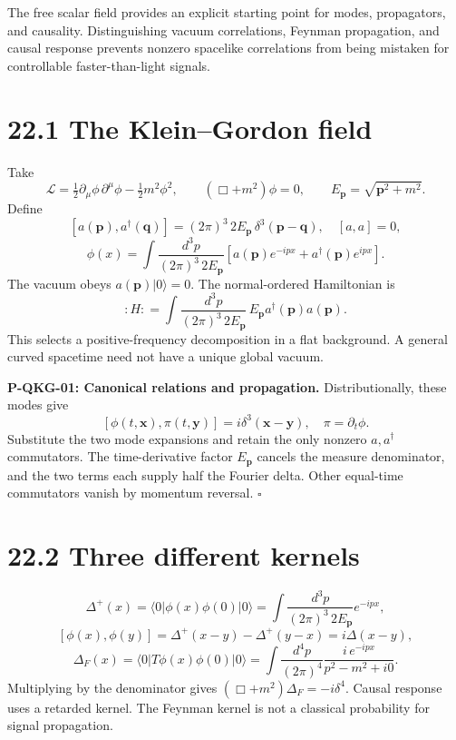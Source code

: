 \documentclass[
  11pt,
  oneside]{book}
\begin{document}
The free scalar field provides an explicit starting point for modes,
propagators, and causality. Distinguishing vacuum correlations, Feynman
propagation, and causal response prevents nonzero spacelike correlations
from being mistaken for controllable faster-than-light signals.

\section{22.1 The Klein--Gordon field}

Take \[
\mathcal L=\tfrac12\partial_\mu\phi\,\partial^\mu\phi-\tfrac12m^2\phi^2,\qquad
(\Box+m^2)\phi=0,\qquad E_{\mathbf p}=\sqrt{\mathbf p^2+m^2}.
\] Define \[
[a(\mathbf p),a^\dagger(\mathbf q)]=(2\pi)^3\,2E_{\mathbf p}\,
\delta^3(\mathbf p-\mathbf q),\quad [a,a]=0,
\] \[
\phi(x)=\int\frac{d^3p}{(2\pi)^3\,2E_{\mathbf p}}
\left[a(\mathbf p)e^{-ipx}+a^\dagger(\mathbf p)e^{ipx}\right].
\] The vacuum obeys \(a(\mathbf p)|0\rangle=0\). The normal-ordered
Hamiltonian is \[
:H: =\int\frac{d^3p}{(2\pi)^3\,2E_{\mathbf p}}\,
E_{\mathbf p}a^\dagger(\mathbf p)a(\mathbf p).
\] This selects a positive-frequency decomposition in a flat background.
A general curved spacetime need not have a unique global vacuum.

\label{p-qkg-01}{}

\textbf{P-QKG-01: Canonical relations and propagation.}
Distributionally, these modes give \[
[\phi(t,\mathbf x),\pi(t,\mathbf y)]=i\delta^3(\mathbf x-\mathbf y),
\quad \pi=\partial_t\phi.
\] Substitute the two mode expansions and retain the only nonzero
\(a,a^\dagger\) commutators. The time-derivative factor
\(E_{\mathbf p}\) cancels the measure denominator, and the two terms
each supply half the Fourier delta. Other equal-time commutators vanish
by momentum reversal. \(\square\)

\section{22.2 Three different kernels}

\[
\Delta^+(x)=\langle0|\phi(x)\phi(0)|0\rangle
=\int\frac{d^3p}{(2\pi)^3\,2E_{\mathbf p}}e^{-ipx},
\] \[
[\phi(x),\phi(y)]=\Delta^+(x-y)-\Delta^+(y-x)=i\Delta(x-y),
\] \[
\Delta_F(x)=\langle0|T\phi(x)\phi(0)|0\rangle
=\int\frac{d^4p}{(2\pi)^4}\frac{i\,e^{-ipx}}{p^2-m^2+i0}.
\] Multiplying by the denominator gives
\((\Box+m^2)\Delta_F=-i\delta^4\). Causal response uses a retarded
kernel. The Feynman kernel is not a classical probability for signal
propagation.
\end{document}
